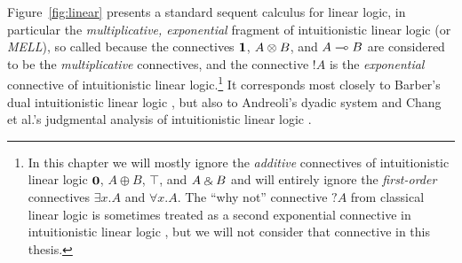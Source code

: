 

Figure~\ref{fig:linear} presents a standard sequent calculus for
linear logic, in particular the {\it multiplicative, exponential}
fragment of intuitionistic linear logic (or {\it MELL}), so called
because the connectives $\mathbf{1}$, $A \otimes B$, and $A \multimap B$ are
considered to be the {\it multiplicative} connectives, and the
connective ${!}A$ is the {\it exponential} connective of
intuitionistic linear logic.\footnote{In this chapter we will mostly
  ignore the {\it additive} connectives of intuitionistic linear logic
  $\mathbf{0}$, $A \oplus B$, $\top$, and $A \mathbin{\binampersand} B$ and will entirely
  ignore the {\it first-order} connectives $\exists x.A$ and $\forall
  x.A$. The ``why not'' connective $\mbox{?}A$ from classical linear
  logic is sometimes treated as a second exponential connective in
  intuitionistic linear logic \cite{chang03judgmental}, but we will
  not consider that connective in this thesis.} It corresponds most
closely to Barber's dual intuitionistic linear logic
\cite{barber96dual}, but also to Andreoli's dyadic system
\cite{andreoli92logic} and Chang et al.'s judgmental analysis of
intuitionistic linear logic \cite{chang03judgmental}.


